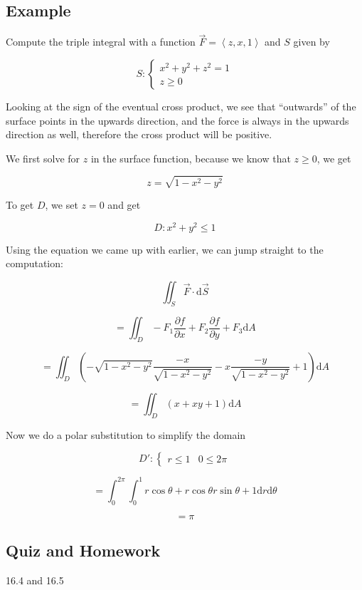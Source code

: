 \documentclass{article}
\newcommand{\D}[1]{\mathrm{d}#1}
\newcommand{\partialfrac}[2]{\dfrac{\partial #1}{\partial #2}}
\begin{document}
\subsection*{Example}

Compute the triple integral with a function $\vec{F} = \left<z,x,1\right>$ and $S$ given by

\[
S: \begin{cases}
  x^2+y^2+z^2 = 1 \\
  z \ge 0
\end{cases}
\]

Looking at the sign of the eventual cross product, we see that ``outwards'' of the surface points in the upwards direction, and the force is always in the upwards direction as well, therefore the cross product will be positive.

We first solve for $z$ in the surface function, because we know that $z \ge 0$, we get

\[
z = \sqrt{1 - x^2 - y^2}
\]

To get $D$, we set $z=0$ and get

\[
D: x^2+y^2 \le 1
\]

Using the equation we came up with earlier, we can jump straight to the computation:

\[
\iint_S \vec{F} \cdot \D{\vec{S}}
\]

\[
= \iint_D - F_1 \partialfrac{f}{x} + F_2 \partialfrac{f}{y} + F_3 \D{A}
\]

\[
= \iint_D \left(
-\sqrt{1-x^2-y^2} \frac{-x}{\sqrt{1-x^2-y^2}}
- x \frac{-y}{\sqrt{1-x^2-y^2}}
+ 1
\right) \D{A}
\]

\[
= \iint_D \left(x + x y + 1\right) \D{A}
\]

Now we do a polar substitution to simplify the domain

\[
D': \begin{cases} r \le 1 & 0 \le 2 \pi \end{cases}
\]

\[
= \int_0^{2\pi} \int_0^1 r \cos{\theta} + r \cos{\theta} r \sin{\theta} + 1 \D{r} \D{\theta}
\]

\[
= \pi
\]

\subsection*{Quiz and Homework}

16.4 and 16.5
\end{document}
